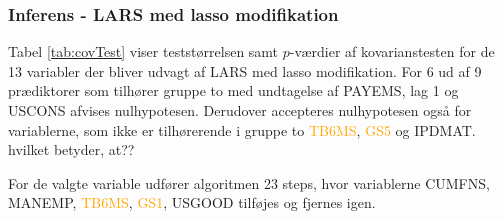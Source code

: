 \subsubsection{Inferens - LARS med lasso modifikation}
Tabel \ref{tab:covTest} viser teststørrelsen samt $p$-værdier af kovarianstesten for de 13 variabler der bliver udvagt af LARS med lasso modifikation. 
For 6 ud af 9 prædiktorer som tilhører gruppe to med undtagelse af \textcolor{blue3}{PAYEMS}, \textcolor{blue3}{lag 1} og \textcolor{blue3}{USCONS} afvises nulhypotesen. Derudover accepteres nulhypotesen også for variablerne, som ikke er tilhørerende i gruppe to \textcolor{orange}{TB6MS}, \textcolor{orange}{GS5} og \textcolor{chartreuse4}{IPDMAT}. 
hvilket betyder, at??%

%
For de valgte variable udfører algoritmen 23 steps, hvor variablerne  \textcolor{chartreuse4}{CUMFNS}, \textcolor{blue3}{MANEMP}, \textcolor{orange}{TB6MS}, \textcolor{orange}{GS1}, \textcolor{blue3}{USGOOD} tilføjes og fjernes igen.



\newpage


%
